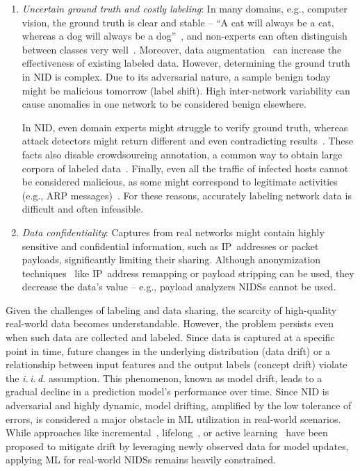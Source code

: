 \begin{enumerate}[wide, label={\arabic*)}, topsep=0pt, itemindent=\parindent, itemsep=0pt, parsep=0pt, partopsep=0pt]
    \item \emph{Uncertain ground truth and costly labeling}: In many domains, e.g., computer vision, the ground truth is clear and stable -- ``A cat will always be a cat, whereas a dog will always be a dog''~\cite{apruzzese2022_sok_unlabeled_data}, and non-experts can often distinguish between classes very well~\cite{law2011_human_computation}. Moreover, data augmentation~\cite{shorten2019_surv_image_data_augmentation} can increase the effectiveness of existing labeled data. However, determining the ground truth in NID is complex. Due to its adversarial nature, a sample benign today might be malicious tomorrow (label shift). High inter-network variability can cause anomalies in one network to be considered benign elsewhere.
    
    In NID, even domain experts might struggle to verify ground truth, whereas attack detectors might return different and even contradicting results~\cite{charlton2018_measuring_relative_accuracy}. These facts also disable crowdsourcing annotation, a common way to obtain large corpora of labeled data~\cite{zhang2016_learning_from_crowdsourced}. Finally, even all the traffic of infected hosts cannot be considered malicious, as some might correspond to legitimate activities (e.g., ARP messages)~\cite{apruzzese2022_sok_unlabeled_data}. For these reasons,
    accurately labeling network data is difficult and often infeasible.

    \item \emph{Data confidentiality}: Captures from real networks might contain highly sensitive and confidential information, such as IP~addresses or packet payloads, significantly limiting their sharing. Although anonymization techniques~\cite{coull2009_anon_net_data_challenges} like IP~address remapping or payload stripping can be used, they decrease the data's value -- e.g., payload analyzers NIDSs cannot be used.
\end{enumerate}

Given the challenges of labeling and data sharing, the scarcity of high-quality real-world data becomes understandable. However, the problem persists even when such data are collected and labeled. Since data is captured at a specific point in time, future changes in the underlying distribution (data drift) or a relationship between input features and the output labels (concept drift) violate the \emph{i.\,i.\,d.} assumption. This phenomenon, known as model drift, leads to a gradual decline in a prediction model’s performance over time. Since NID is adversarial and highly dynamic, model drifting, amplified by the low tolerance of errors, is considered a major obstacle in ML utilization in real-world scenarios. While approaches like incremental~\cite{masana2023_class_incremental_learning}, lifelong~\cite{parisi2019_lifelong_learning_review}, or active learning~\cite{settles2009_active_learning_survey} have been proposed to mitigate drift by leveraging newly observed data for model updates, applying ML for real-world NIDSs remains heavily constrained.

